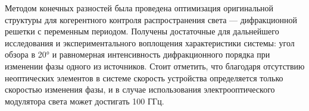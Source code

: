 
Методом конечных разностей была проведена оптимизация оригинальной структуры для когерентного контроля распространения света --- дифракционной решетки с переменным периодом. Получены достаточные для дальнейшего исследования и экспериментального воплощения характеристики системы: угол обзора в 20° и равномерная интенсивность дифракционного порядка при изменении фазы одного из источников. Стоит отметить, что благодаря отсутствию неоптических элементов в системе скорость устройства определяется только скоростью изменения фазы, и в случае использования электрооптического модулятора света может достигать 100 ГГц.
